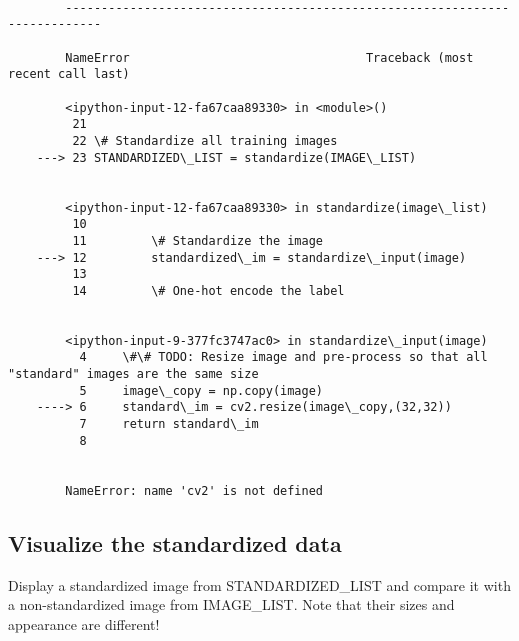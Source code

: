 \documentclass[11pt]{article}
\begin{document}
    \begin{Verbatim}[commandchars=\\\{\}]

        ---------------------------------------------------------------------------

        NameError                                 Traceback (most recent call last)

        <ipython-input-12-fa67caa89330> in <module>()
         21 
         22 \# Standardize all training images
    ---> 23 STANDARDIZED\_LIST = standardize(IMAGE\_LIST)
    

        <ipython-input-12-fa67caa89330> in standardize(image\_list)
         10 
         11         \# Standardize the image
    ---> 12         standardized\_im = standardize\_input(image)
         13 
         14         \# One-hot encode the label


        <ipython-input-9-377fc3747ac0> in standardize\_input(image)
          4     \#\# TODO: Resize image and pre-process so that all "standard" images are the same size
          5     image\_copy = np.copy(image)
    ----> 6     standard\_im = cv2.resize(image\_copy,(32,32))
          7     return standard\_im
          8 


        NameError: name 'cv2' is not defined

    \end{Verbatim}

    \hypertarget{visualize-the-standardized-data}{%
\subsection{Visualize the standardized
data}\label{visualize-the-standardized-data}}

Display a standardized image from STANDARDIZED\_LIST and compare it with
a non-standardized image from IMAGE\_LIST. Note that their sizes and
appearance are different!
\end{document}
